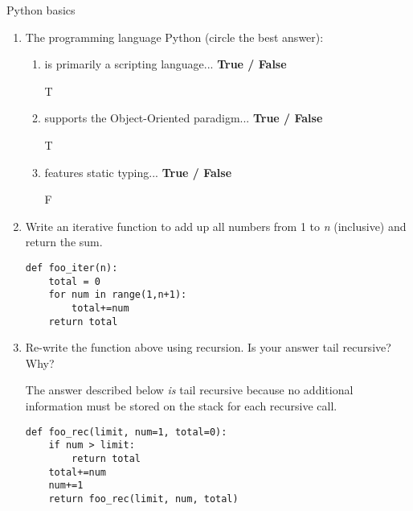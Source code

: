 Python basics
\begin{enumerate}

\item The programming language Python (circle the best answer):
	\begin{enumerate}
		\item is primarily a scripting language...
								\hspace{42mm}\textbf{True / False}
								\hspace{10mm}\begin{answer} T \end{answer}
		\item supports the Object-Oriented paradigm...
								\hspace{29mm}\textbf{True / False}
								\hspace{10mm}\begin{answer} T \end{answer}
		\item features static typing...
								\hspace{60mm}\textbf{True / False}
								\hspace{10mm}\begin{answer} F \end{answer}
	\end{enumerate}


\item Write an iterative function to add up all numbers from 1 to \emph{n} (inclusive) and return the sum.

\begin{answer}
\begin{lstlisting}
def foo_iter(n):
	total = 0
	for num in range(1,n+1):
		total+=num
	return total
\end{lstlisting}
\end{answer}

\item Re-write the function above using recursion. Is your answer tail recursive?  Why?

\begin{answer}
The answer described below \emph{is} tail recursive because no additional information must be stored on the stack for each recursive call.

\begin{lstlisting}
def foo_rec(limit, num=1, total=0):
	if num > limit:
		return total
	total+=num
	num+=1
	return foo_rec(limit, num, total)
\end{lstlisting}
\end{answer}


\end{enumerate}
